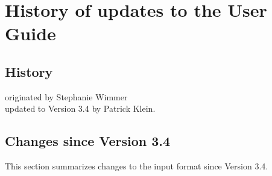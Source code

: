 
\section{History of updates to the \tahoe User Guide}

\subsection{History}
originated by Stephanie Wimmer\\
updated to Version 3.4 by Patrick Klein.

\subsection{Changes since Version 3.4}
\label{sect.changes.log}
This section summarizes changes to the \tahoe input format
since Version 3.4.
